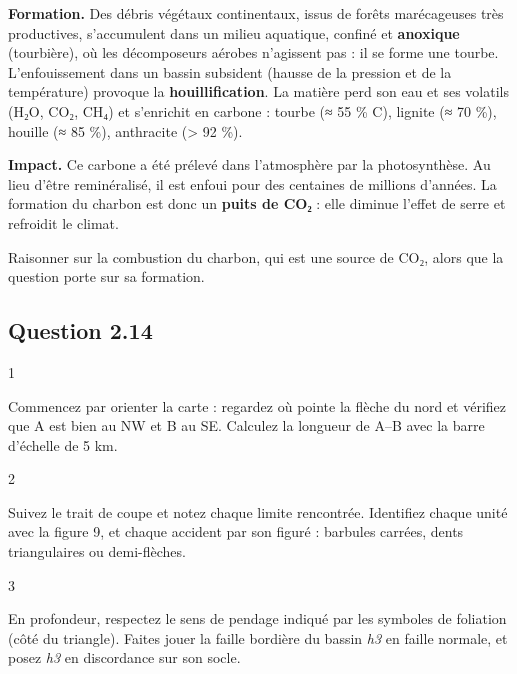 \documentclass[11pt,a4paper]{article}
\begin{document}
\textbf{Formation.} Des débris végétaux continentaux, issus de forêts marécageuses très productives, s'accumulent dans un milieu aquatique, confiné et \textbf{anoxique} (tourbière), où les décomposeurs aérobes n'agissent pas : il se forme une tourbe. L'enfouissement dans un bassin subsident (hausse de la pression et de la température) provoque la \textbf{houillification}. La matière perd son eau et ses volatils (H₂O, CO₂, CH₄) et s'enrichit en carbone : tourbe (≈ 55 \% C), lignite (≈ 70 \%), houille (≈ 85 \%), anthracite (\textgreater{} 92 \%).

\textbf{Impact.} Ce carbone a été prélevé dans l'atmosphère par la photosynthèse. Au lieu d'être reminéralisé, il est enfoui pour des centaines de millions d'années. La formation du charbon est donc un \textbf{puits de CO₂} : elle diminue l'effet de serre et refroidit le climat.

\begin{piege}

Raisonner sur la combustion du charbon, qui est une source de CO₂, alors que la question porte sur sa formation.

\end{piege}

\hypertarget{question-2.14}{%
\subsection{Question 2.14}\label{question-2.14}}

\begin{indication}{1}

Commencez par orienter la carte : regardez où pointe la flèche du nord et vérifiez que A est bien au NW et B au SE. Calculez la longueur de A--B avec la barre d'échelle de 5 km.

\end{indication}

\begin{indication}{2}

Suivez le trait de coupe et notez chaque limite rencontrée. Identifiez chaque unité avec la figure 9, et chaque accident par son figuré : barbules carrées, dents triangulaires ou demi-flèches.

\end{indication}

\begin{indication}{3}

En profondeur, respectez le sens de pendage indiqué par les symboles de foliation (côté du triangle). Faites jouer la faille bordière du bassin \emph{h3} en faille normale, et posez \emph{h3} en discordance sur son socle.

\end{indication}
\end{document}

